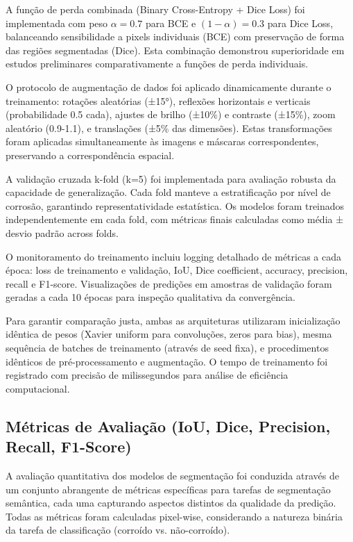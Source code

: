 \documentclass[12pt,a4paper,twoside]{article}
\begin{document}
A função de perda combinada (Binary Cross-Entropy + Dice Loss) foi implementada com peso $\alpha=0.7$ para BCE e $(1-\alpha)=0.3$ para Dice Loss, balanceando sensibilidade a pixels individuais (BCE) com preservação de forma das regiões segmentadas (Dice). Esta combinação demonstrou superioridade em estudos preliminares comparativamente a funções de perda individuais.

O protocolo de augmentação de dados foi aplicado dinamicamente durante o treinamento: rotações aleatórias (±15°), reflexões horizontais e verticais (probabilidade 0.5 cada), ajustes de brilho (±10\%) e contraste (±15\%), zoom aleatório (0.9-1.1), e translações (±5\% das dimensões). Estas transformações foram aplicadas simultaneamente às imagens e máscaras correspondentes, preservando a correspondência espacial.

A validação cruzada k-fold (k=5) foi implementada para avaliação robusta da capacidade de generalização. Cada fold manteve a estratificação por nível de corrosão, garantindo representatividade estatística. Os modelos foram treinados independentemente em cada fold, com métricas finais calculadas como média ± desvio padrão across folds.

O monitoramento do treinamento incluiu logging detalhado de métricas a cada época: loss de treinamento e validação, IoU, Dice coefficient, accuracy, precision, recall e F1-score. Visualizações de predições em amostras de validação foram geradas a cada 10 épocas para inspeção qualitativa da convergência.

Para garantir comparação justa, ambas as arquiteturas utilizaram inicialização idêntica de pesos (Xavier uniform para convoluções, zeros para bias), mesma sequência de batches de treinamento (através de seed fixa), e procedimentos idênticos de pré-processamento e augmentação. O tempo de treinamento foi registrado com precisão de milissegundos para análise de eficiência computacional.

\subsection{Métricas de Avaliação (IoU, Dice, Precision, Recall, F1-Score)}
\label{subsec:metricas}

A avaliação quantitativa dos modelos de segmentação foi conduzida através de um conjunto abrangente de métricas específicas para tarefas de segmentação semântica, cada uma capturando aspectos distintos da qualidade da predição. Todas as métricas foram calculadas pixel-wise, considerando a natureza binária da tarefa de classificação (corroído vs. não-corroído).
\end{document}

